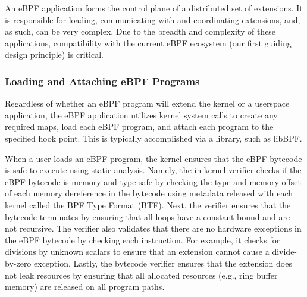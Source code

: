 An eBPF application forms the control plane of a distributed set of extensions.  It is responsible for loading, communicating with and coordinating extensions, and, as such, can be very complex.  Due to the breadth and complexity of these applications, compatibility with the current eBPF ecosystem (our first guiding design principle) is critical.



\subsubsection{Loading and Attaching eBPF Programs}

Regardless of whether an eBPF program will extend the kernel or a userspace application, the eBPF application utilizes kernel system calls to create any required maps, load each eBPF program, and attach each program to the specified hook point.  This is typically accomplished via a library, such as libBPF.

When a user loads an eBPF program, the kernel ensures that the eBPF bytecode is safe to execute using static analysis.  Namely, the in-kernel verifier checks if the eBPF bytecode is memory and type safe by checking the type and memory offset of each memory dereference in the bytecode using metadata released with each kernel called the BPF Type Format (BTF).  Next, the verifier ensures that the bytecode terminates by ensuring that all loops have a constant bound and are not recursive. The verifier also validates that there are no hardware exceptions in the eBPF bytecode by checking each instruction.  For example, it checks for divisions by unknown scalars to ensure that an extension cannot cause a divide-by-zero exception.  Lastly, the bytecode verifier ensures that the extension does not leak resources by ensuring that all allocated resources (e.g., ring buffer memory) are released on all program paths.

